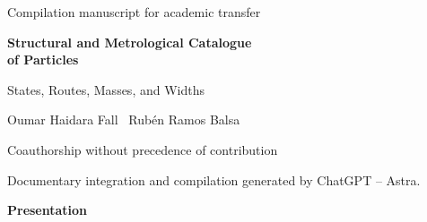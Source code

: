 \documentclass[a4paper,10pt]{article}
\begin{document}
\thispagestyle{empty}
\begin{center}
{\fontsize{8}{10}\selectfont Compilation manuscript for academic transfer\par}
\vspace{12mm}
{\fontsize{17}{20.5}\selectfont\bfseries Structural and Metrological Catalogue\\of Particles\par}
\vspace{6pt}
{\fontsize{11}{13.5}\selectfont States, Routes, Masses, and Widths\par}
\vspace{11pt}
{\fontsize{11.5}{14}\selectfont Oumar Haidara Fall \textperiodcentered\ Rubén Ramos Balsa\par}
\vspace{4pt}
{\fontsize{8}{10}\selectfont Coauthorship without precedence of contribution\par}
\vspace{3pt}
{\fontsize{7.5}{9.5}\selectfont Documentary integration and compilation generated by ChatGPT -- Astra.\par}
\end{center}
\vspace{7pt}
\begin{center}\bfseries Presentation\end{center}
\begingroup
\fontsize{10.5}{12.8}\selectfont
\setlength{\parskip}{2pt plus 1pt minus .5pt}
\noindent
\end{document}
